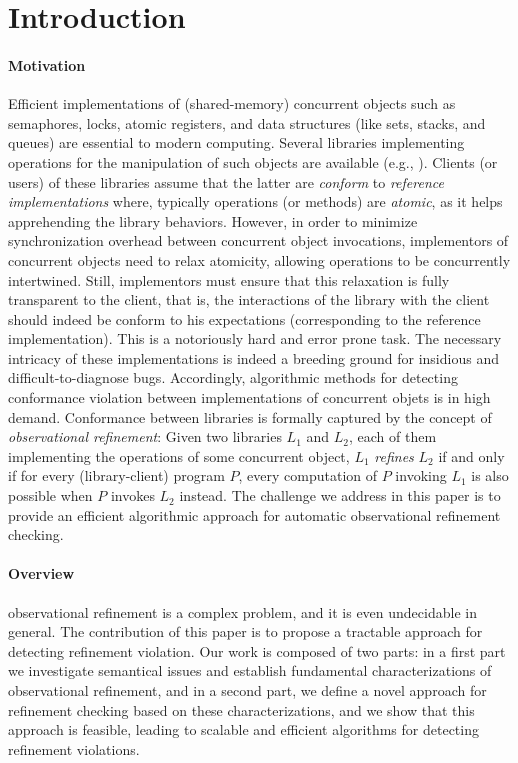 \section{Introduction}

\paragraph{Motivation}

Efficient implementations of (shared-memory) concurrent objects such as
semaphores, locks, atomic registers, and data structures (like sets, stacks,
and queues) are essential to modern computing. Several libraries implementing
operations for the manipulation of such objects are available (e.g., \cite{}).
Clients (or users) of these libraries assume that the latter are \emph{conform}
to \emph{reference implementations} where, typically operations (or methods) are
\emph{atomic}, as it helps apprehending the library behaviors. However, in order
to minimize synchronization overhead between concurrent object invocations,
implementors of concurrent objects need to relax atomicity, allowing operations
to be concurrently intertwined. Still, implementors must ensure that this
relaxation is fully transparent to the client, that is, the interactions of the
library with the client should indeed be conform to his expectations
(corresponding to the reference implementation). This is a notoriously hard and
error prone task. The necessary intricacy of these implementations is indeed a
breeding ground for insidious and difficult-to-diagnose bugs. Accordingly,
algorithmic methods for detecting conformance violation between implementations
of concurrent objets is in high demand. Conformance between libraries is
formally captured by the concept of \emph{observational refinement}: Given two
libraries $L_1$ and $L_2$, each of them implementing the operations of some
concurrent object, $L_1$ \emph{refines} $L_2$ if and only if for every
(library-client) program $P$, every computation of $P$ invoking $L_1$ is also
possible when $P$ invokes $L_2$ instead. The challenge we address in this paper is to provide an 
efficient algorithmic approach for automatic observational refinement checking.

\paragraph{Overview}

observational refinement is a complex problem, and it is even undecidable in general. The contribution of this paper is to propose a tractable approach for detecting refinement violation. Our work is composed of two parts: in a first part we investigate semantical issues and establish fundamental characterizations of observational refinement, and in a second part, we define a novel approach for refinement checking based on these characterizations, and we show that this approach is feasible, leading to scalable and efficient algorithms for detecting refinement violations.

